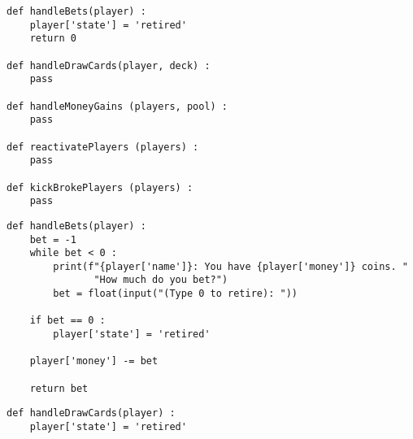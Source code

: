 \begin{frame}[fragile]
%
\begin{codebox}
\begin{verbatim}
def handleBets(player) :
    player['state'] = 'retired'
    return 0

def handleDrawCards(player, deck) :
    pass

def handleMoneyGains (players, pool) :
    pass

def reactivatePlayers (players) :
    pass

def kickBrokePlayers (players) :
    pass
\end{verbatim}
\end{codebox}
%
\end{frame}


\begin{frame}[fragile]
%
\begin{codebox}
\begin{verbatim}
def handleBets(player) :
    bet = -1
    while bet < 0 :
        print(f"{player['name']}: You have {player['money']} coins. "
               "How much do you bet?")
        bet = float(input("(Type 0 to retire): "))
    
    if bet == 0 :
        player['state'] = 'retired'
    
    player['money'] -= bet
    
    return bet
\end{verbatim}
\end{codebox}
%
\begin{codebox}
\begin{verbatim}
def handleDrawCards(player) :
    player['state'] = 'retired'
\end{verbatim}
\end{codebox}
%
\end{frame}



